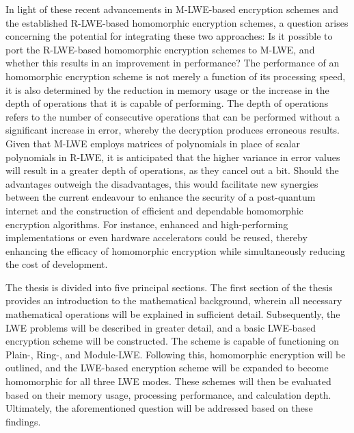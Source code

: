 
In light of these recent advancements in M-LWE-based encryption schemes and the established R-LWE-based homomorphic encryption schemes, a question arises concerning the potential for integrating these two approaches: Is it possible to port the R-LWE-based homomorphic encryption schemes to M-LWE, and whether this results in an improvement in performance? The performance of an homomorphic encryption scheme is not merely a function of its processing speed, it is also determined by the reduction in memory usage or the increase in the depth of operations that it is capable of performing. The depth of operations refers to the number of consecutive operations that can be performed without a significant increase in error, whereby the decryption produces erroneous results. Given that M-LWE employs matrices of polynomials in place of scalar polynomials in R-LWE, it is anticipated that the higher variance in error values will result in a greater depth of operations, as they cancel out a bit. Should the advantages outweigh the disadvantages, this would facilitate new synergies between the current endeavour to enhance the security of a post-quantum internet and the construction of efficient and dependable homomorphic encryption algorithms. For instance, enhanced and high-performing implementations or even hardware accelerators could be reused, thereby enhancing the efficacy of homomorphic encryption while simultaneously reducing the cost of development.

The thesis is divided into five principal sections. The first section of the thesis provides an introduction to the mathematical background, wherein all necessary mathematical operations will be explained in sufficient detail. Subsequently, the LWE problems will be described in greater detail, and a basic LWE-based encryption scheme will be constructed. The scheme is capable of functioning on Plain-, Ring-, and Module-LWE. Following this, homomorphic encryption will be outlined, and the LWE-based encryption scheme will be expanded to become homomorphic for all three LWE modes. These schemes will then be evaluated based on their memory usage, processing performance, and calculation depth. Ultimately, the aforementioned question will be addressed based on these findings.
